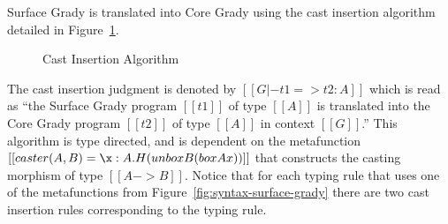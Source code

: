 Surface Grady is translated into Core Grady using the cast insertion
algorithm detailed in Figure~\ref{fig:cast-insert}.
\begin{figure}
  \scriptsize
  \begin{mdframed}
  \end{mdframed}
  \caption{Cast Insertion Algorithm}
  \label{fig:cast-insert}
\end{figure}
The cast insertion judgment is denoted by $[[G |- t1 => t2 : A]]$
which is read as ``the Surface Grady program $[[t1]]$ of type $[[A]]$
is translated into the Core Grady program $[[t2]]$ of type $[[A]]$ in
context $[[G]]$.''  This algorithm is type directed, and is dependent
on the metafunction $[[caster(A,B) = \x:A.H(unbox B (box A x))]]$ that
constructs the casting morphism of type $[[A -> B]]$.  Notice that for
each typing rule that uses one of the metafunctions from
Figure~\ref{fig:syntax-surface-grady} there are two cast insertion
rules corresponding to the typing rule.

